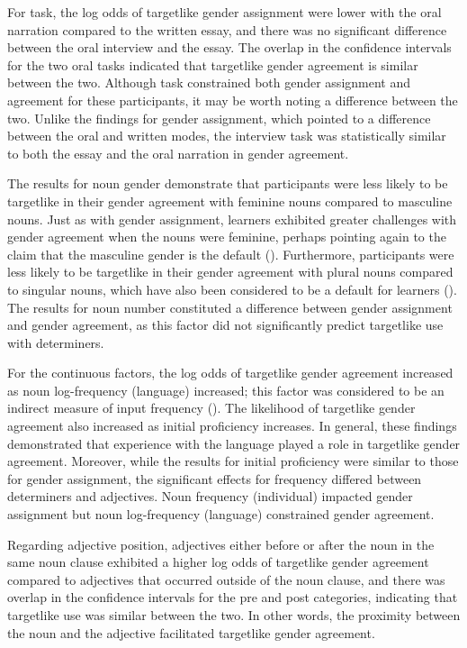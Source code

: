 \documentclass[output=paper,colorlinks,citecolor=brown,modfonts,nonflat]{../langscibook}
\begin{document}
For task, the log odds of targetlike gender assignment were lower with the oral narration compared to the written essay, and there was no significant difference between the oral interview and the essay. The overlap in the confidence intervals for the two oral tasks indicated that targetlike gender agreement is similar between the two. Although task constrained both gender assignment and agreement for these participants, it may be worth noting a difference between the two. Unlike the findings for gender assignment, which pointed to a difference between the oral and written modes, the interview task was statistically similar to both the essay and the oral narration in gender agreement. 



The results for noun gender demonstrate that participants were less likely to be targetlike in their gender agreement with feminine nouns compared to masculine nouns. Just as with gender assignment, learners exhibited greater challenges with gender agreement when the nouns were feminine, perhaps pointing again to the claim that the masculine gender is the default (\citealt{López-PregoGabriele2012}). Furthermore, participants were less likely to be targetlike in their gender agreement with plural nouns compared to singular nouns, which have also been considered to be a default for learners (\citealt{López-PregoGabriele2012}). The results for noun number constituted a difference between gender assignment and gender agreement, as this factor did not significantly predict targetlike use with determiners.



 For the continuous factors, the log odds of targetlike gender agreement increased as noun log-frequency (language) increased; this factor was considered to be an indirect measure of input frequency (\citealt{GudmestadEtAl2019}). The likelihood of targetlike gender agreement also increased as initial proficiency increases. In general, these findings demonstrated that experience with the language played a role in targetlike gender agreement. Moreover, while the results for initial proficiency were similar to those for gender assignment, the significant effects for frequency differed between determiners and adjectives. Noun frequency (individual) impacted gender assignment but noun log-frequency (language) constrained gender agreement.



Regarding adjective position, adjectives either before or after the noun in the same noun clause exhibited a higher log odds of targetlike gender agreement compared to adjectives that occurred outside of the noun clause, and there was overlap in the confidence intervals for the pre and post categories, indicating that targetlike use was similar between the two. In other words, the proximity between the noun and the adjective facilitated targetlike gender agreement.
\end{document}
